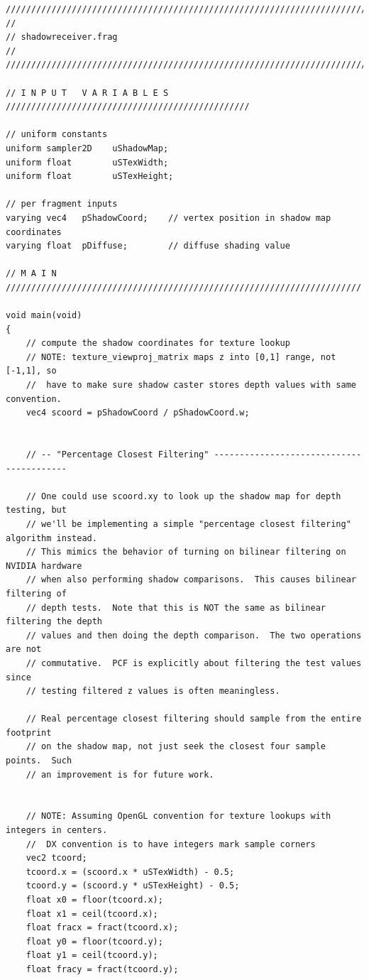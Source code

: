 \documentclass[]{article}  %
\begin{document}
\begin{verbatim}
/////////////////////////////////////////////////////////////////////////////////
//
// shadowreceiver.frag
//
/////////////////////////////////////////////////////////////////////////////////

// I N P U T   V A R I A B L E S ////////////////////////////////////////////////

// uniform constants
uniform sampler2D    uShadowMap;
uniform float        uSTexWidth;
uniform float        uSTexHeight;

// per fragment inputs
varying vec4   pShadowCoord;    // vertex position in shadow map coordinates
varying float  pDiffuse;        // diffuse shading value

// M A I N //////////////////////////////////////////////////////////////////////

void main(void)
{
    // compute the shadow coordinates for texture lookup
    // NOTE: texture_viewproj_matrix maps z into [0,1] range, not [-1,1], so
    //  have to make sure shadow caster stores depth values with same convention.
    vec4 scoord = pShadowCoord / pShadowCoord.w;


    // -- "Percentage Closest Filtering" ----------------------------------------- 

    // One could use scoord.xy to look up the shadow map for depth testing, but
    // we'll be implementing a simple "percentage closest filtering" algorithm instead.
    // This mimics the behavior of turning on bilinear filtering on NVIDIA hardware
    // when also performing shadow comparisons.  This causes bilinear filtering of
    // depth tests.  Note that this is NOT the same as bilinear filtering the depth
    // values and then doing the depth comparison.  The two operations are not 
    // commutative.  PCF is explicitly about filtering the test values since
    // testing filtered z values is often meaningless.  

    // Real percentage closest filtering should sample from the entire footprint
    // on the shadow map, not just seek the closest four sample points.  Such 
    // an improvement is for future work.

    
    // NOTE: Assuming OpenGL convention for texture lookups with integers in centers.
    //  DX convention is to have integers mark sample corners
    vec2 tcoord;
    tcoord.x = (scoord.x * uSTexWidth) - 0.5;
    tcoord.y = (scoord.y * uSTexHeight) - 0.5;
    float x0 = floor(tcoord.x);
    float x1 = ceil(tcoord.x);
    float fracx = fract(tcoord.x);
    float y0 = floor(tcoord.y);
    float y1 = ceil(tcoord.y);
    float fracy = fract(tcoord.y);
    

\end{verbatim}
\end{document}
